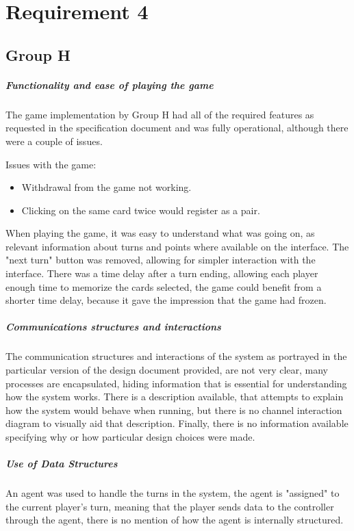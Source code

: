 \documentclass[10pt, a4paper]{article}
\begin{document}
	\section{Requirement 4}
	\subsection{Group H}
	
	\subparagraph{Functionality and ease of playing the game}
	The game implementation by Group H had all of the required features as requested in the specification document and was fully operational, although there were a couple of issues. 			

	Issues with the game:
	\begin{itemize}
	\item{Withdrawal from the game not working.}
	\item{Clicking on the same card twice would register as a pair.}
	\end{itemize}
	When playing the game, it was easy to understand what was going on, as relevant information about turns and points where available on the interface. The "next turn" button was 		removed, allowing for simpler interaction with the interface. There was a time delay after a turn ending, allowing each player enough time to memorize the cards selected, the game 	could benefit from a shorter time delay, because it gave the impression that the game had frozen.
	\subparagraph{Communications structures and interactions}
	The communication structures and interactions of the system as portrayed in the particular version of the design document provided, are not very clear, many processes are encapsulated, hiding information that is essential for understanding how the system works. There is a description available, that attempts to explain how the system would behave when running, but there is no channel interaction diagram to visually aid that description. Finally, there is no information available specifying why or how particular design choices were made.
	\subparagraph{Use of Data Structures}
	An agent was used to handle the turns in the system, the agent is "assigned" to the current player's turn, meaning that the player sends data to the controller through the agent, there is no mention of how the agent is internally structured.
\end{document}
